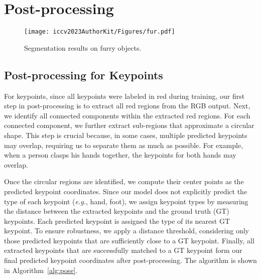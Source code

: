 

\section{Post-processing}

\label{appendix:post_processing}

\begin{figure*}[h!]
  \centering
  \texttt{[image: iccv2023AuthorKit/Figures/fur.pdf]}
  \caption{
   Segmentation results on furry objects.
  }
  \label{fig:fur}
\end{figure*}






\subsection{Post-processing for Keypoints}
For keypoints, since all keypoints were labeled in red during training, our first step in post-processing is to extract all red regions from the RGB output. Next, we identify all connected components within the extracted red regions. For each connected component, we further extract sub-regions that approximate a circular shape. This step is crucial because, in some cases, multiple predicted keypoints may overlap, requiring us to separate them as much as possible. For example, when a person clasps his hands together, the keypoints for both hands may overlap.

Once the circular regions are identified, we compute their center points as the predicted keypoint coordinates. Since our model does not explicitly predict the type of each keypoint (\textit{e.g.}, hand, foot), we assign keypoint types by measuring the distance between the extracted keypoints and the ground truth (GT) keypoints. Each predicted keypoint is assigned the type of its nearest GT keypoint. To ensure robustness, we apply a distance threshold, considering only those predicted keypoints that are sufficiently close to a GT keypoint. Finally, all extracted keypoints that are successfully matched to a GT keypoint form our final predicted keypoint coordinates after post-processing. The algorithm is shown in Algorithm~\ref{alg:pose}.

